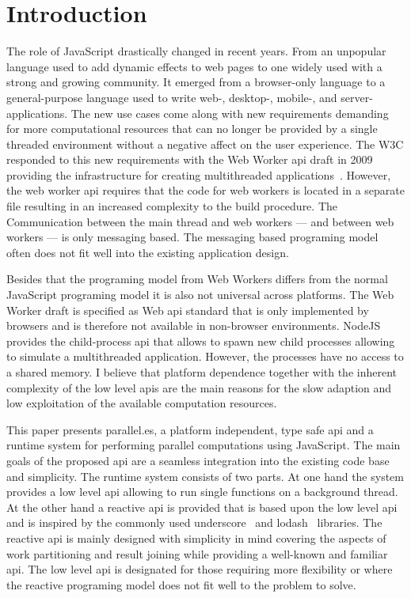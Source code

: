 \section{Introduction}\label{sec:introduction}
The role of JavaScript drastically changed in recent years. From an unpopular language used to add dynamic effects to web pages to one widely used with a strong and growing community. It emerged from a browser-only language to a general-purpose language used to write web-, desktop-, mobile-, and server-applications. The new use cases come along with new requirements demanding for more computational resources that can no longer be provided by a single threaded environment without a negative affect on the user experience. The W3C responded to this new requirements with the Web Worker api draft in 2009 providing the infrastructure for creating multithreaded applications~\cite{w3cWebWorker}. However, the web worker api requires that the code for web workers is located in a separate file resulting in an increased complexity to the build procedure. The Communication between the main thread and web workers --- and between web workers --- is only messaging based. The messaging based programing model often does not fit well into the existing application design. 

Besides that the programing model from Web Workers differs from the normal JavaScript programing model it is also not universal across platforms. The Web Worker draft is specified as Web api standard that is only implemented by browsers and is therefore not available in non-browser environments. NodeJS provides the child-process api that allows to spawn new child processes allowing to simulate a multithreaded application. However, the processes have no access to a shared memory. I believe that platform dependence together with the inherent complexity of the low level apis are the main reasons for the slow adaption and low exploitation of the available computation resources.

This paper presents parallel.es, a platform independent, type safe api and a runtime system for performing parallel computations using JavaScript. The main goals of the proposed api are a seamless integration into the existing code base and simplicity. The runtime system consists of two parts. At one hand the system provides a low level api allowing to run single functions on a background thread. At the other hand a reactive api is provided that is based upon the low level api and is inspired by the commonly used underscore~\cite{underscorejs} and lodash~\cite{lodash} libraries. The reactive api is mainly designed with simplicity in mind covering the aspects of work partitioning and result joining while providing a well-known and familiar api. The low level api is designated for those requiring more flexibility or where the reactive programing model does not fit well to the problem to solve. 
		
